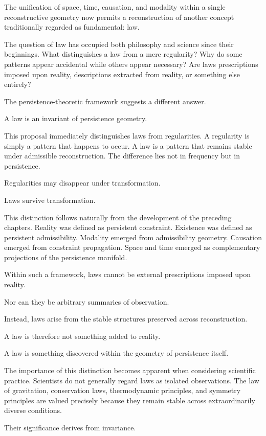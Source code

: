\documentclass[12pt,oneside]{article}
\theoremstyle{definition}
\begin{document}
The unification of space, time, causation, and modality within a single reconstructive geometry now permits a reconstruction of another concept traditionally regarded as fundamental: law.

The question of law has occupied both philosophy and science since their beginnings. What distinguishes a law from a mere regularity? Why do some patterns appear accidental while others appear necessary? Are laws prescriptions imposed upon reality, descriptions extracted from reality, or something else entirely?

The persistence-theoretic framework suggests a different answer.

A law is an invariant of persistence geometry.

This proposal immediately distinguishes laws from regularities. A regularity is simply a pattern that happens to occur. A law is a pattern that remains stable under admissible reconstruction. The difference lies not in frequency but in persistence.

Regularities may disappear under transformation.

Laws survive transformation.

This distinction follows naturally from the development of the preceding chapters. Reality was defined as persistent constraint. Existence was defined as persistent admissibility. Modality emerged from admissibility geometry. Causation emerged from constraint propagation. Space and time emerged as complementary projections of the persistence manifold.

Within such a framework, laws cannot be external prescriptions imposed upon reality.

Nor can they be arbitrary summaries of observation.

Instead, laws arise from the stable structures preserved across reconstruction.

A law is therefore not something added to reality.

A law is something discovered within the geometry of persistence itself.

The importance of this distinction becomes apparent when considering scientific practice. Scientists do not generally regard laws as isolated observations. The law of gravitation, conservation laws, thermodynamic principles, and symmetry principles are valued precisely because they remain stable across extraordinarily diverse conditions.

Their significance derives from invariance.
\end{document}
